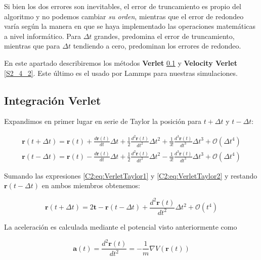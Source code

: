 Si bien los dos errores son inevitables, el error de truncamiento es propio del algoritmo y no podemos cambiar \textit{su orden}, mientras que el error de redondeo varía según la manera en que se haya implementado las operaciones matemáticas a nivel informático. Para $\Delta{}t$ grandes, predomina el error de truncamiento, mientras que para $\Delta{}t$ tendiendo a cero, predominan los errores de redondeo.

En este apartado describiremos los métodos \textbf{Verlet} \ref{S2_4_1} y \textbf{Velocity Verlet} \ref{S2_4_2}. Este último es el usado por Lammps para nuestras simulaciones.

\subsection{Integración Verlet}
\label{S2_4_1}

Expandimos en primer lugar en serie de Taylor la posición para $t+\Delta{}t$ y $t-\Delta{}t$:

\begin{eqnarray}
\mathbf{r}(t+\Delta{}t) = \mathbf{r}(t)+\frac{d\mathbf{r}(t)}{dt} \Delta{}t + \frac{1}{2} \frac{d^{2}\mathbf{r}(t)}{dt^{2}} \Delta{}t^{2} + \frac{1}{3!} \frac{d^{3}\mathbf{r}(t)}{dt^{3}} \Delta{}t^{3} + \mathcal{O}(\Delta{}t^{4})
\label{C2:eq:VerletTaylor1} \\
\mathbf{r}(t-\Delta{}t) = \mathbf{r}(t)-\frac{d\mathbf{r}(t)}{dt} \Delta{}t + \frac{1}{2} \frac{d^{2}\mathbf{r}(t)}{dt^{2}} \Delta{}t^{2} - \frac{1}{3!} \frac{d^{3}\mathbf{r}(t)}{dt^{3}} \Delta{}t^{3} + \mathcal{O}(\Delta{}t^{4})
\label{C2:eq:VerletTaylor2}
\end{eqnarray}

Sumando las expresiones \ref{C2:eq:VerletTaylor1} y \ref{C2:eq:VerletTaylor2} y restando $\mathbf{r}(t-\Delta{}t)$ en ambos miembros obtenemos:

\begin{equation}
\mathbf{r}(t+\Delta{}t) = 2\mathbf{t} - \mathbf{r}(t-\Delta{}t) + \frac{d^{2}\mathbf{r}(t)}{dt^{2}} \Delta{}t^{2} + \mathcal{O}(t^{4})
\label{C2:eq:VerletPos}
\end{equation}

La aceleración es calculada mediante el potencial visto anteriormente como

\begin{equation}
\mathbf{a}(t) = \frac{d^{2}\mathbf{r}(t)}{dt^{2}} = -\frac{1}{m}\nabla{}V(\mathbf{r}(t))
\end{equation}

